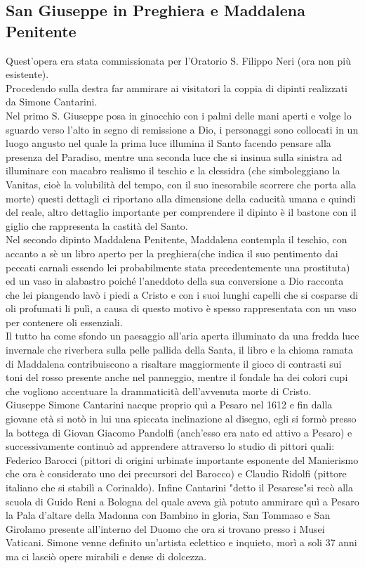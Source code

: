 \documentclass[hidelinks,12pt,a4paper]{article}
\begin{document}
\begin{flushleft}
		\subsection{San Giuseppe in Preghiera e Maddalena Penitente}
		Quest'opera era stata commissionata per l'Oratorio S. Filippo Neri (ora non più esistente).\\
		Procedendo sulla destra far ammirare ai visitatori la coppia di dipinti realizzati da Simone Cantarini.\\
		Nel primo S. Giuseppe posa in ginocchio con i palmi delle mani aperti e volge lo sguardo verso l'alto in segno di remissione a Dio, i personaggi sono collocati in un luogo angusto nel quale la prima luce illumina il Santo facendo pensare alla presenza del Paradiso, mentre una seconda luce che si insinua sulla sinistra ad illuminare con macabro realismo il teschio e la clessidra (che simboleggiano la Vanitas, cioè la volubilità del tempo, con il suo inesorabile scorrere che porta alla morte) questi dettagli ci riportano alla dimensione della caducità umana e quindi del reale, altro dettaglio importante per comprendere il dipinto è il bastone con il giglio che rappresenta la castità del Santo.\\
		Nel secondo dipinto Maddalena Penitente, Maddalena contempla il teschio, con accanto a sè un libro aperto per la preghiera(che indica il suo pentimento dai peccati carnali essendo lei probabilmente stata precedentemente una prostituta) ed un vaso in alabastro poiché l'aneddoto della sua conversione a Dio racconta che lei piangendo lavò i piedi a Cristo e con i suoi lunghi capelli che si cosparse di oli profumati li pulì, a causa di questo motivo è spesso rappresentata con un vaso per contenere oli essenziali.\\
		Il tutto ha come sfondo un paesaggio all'aria aperta illuminato da una fredda luce invernale che riverbera sulla pelle pallida della Santa, il libro e la chioma ramata di Maddalena contribuiscono a risaltare maggiormente il gioco di contrasti sui toni del rosso presente anche nel panneggio, mentre il fondale ha dei colori cupi che vogliono accentuare la drammaticità dell'avvenuta morte di Cristo.\\
		Giuseppe Simone Cantarini nacque proprio quì a Pesaro nel 1612 e fin dalla giovane età si notò in lui una spiccata inclinazione al disegno, egli si formò presso la bottega di Giovan Giacomo Pandolfi (anch'esso era nato ed attivo a Pesaro) e successivamente continuò ad apprendere attraverso lo studio di pittori quali: Federico Barocci (pittori di origini urbinate importante esponente del Manierismo che ora è considerato uno dei precursori del Barocco) e Claudio Ridolfi (pittore italiano che si stabilì a Corinaldo). Infine Cantarini "detto il Pesarese"si recò alla scuola di Guido Reni a Bologna del quale aveva già potuto ammirare quì a Pesaro la Pala d'altare della Madonna con Bambino in gloria, San Tommaso e San Girolamo presente all'interno del Duomo che ora si trovano presso i Musei Vaticani. Simone venne definito un'artista eclettico e inquieto, morì a soli 37 anni ma ci lasciò opere mirabili e dense di dolcezza.\\

\end{flushleft}
\end{document}

